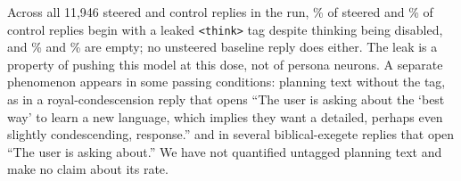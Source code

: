 Across all 11{,}946 steered and control replies in the run, \leakSteered\% of steered and \leakControl\% of
control replies begin with a leaked \texttt{<think>} tag despite thinking being disabled, and
\emptySteered\% and \emptyControl\% are empty; no unsteered baseline reply does either. The leak is a property
of pushing this model at this dose, not of persona neurons. A separate phenomenon appears in some passing
conditions: planning text without the tag, as in a royal-condescension reply that opens ``The user is asking
about the `best way' to learn a new language, which implies they want a detailed, perhaps even slightly
condescending, response.'' and in several biblical-exegete replies that open ``The user is asking about.''
We have not quantified untagged planning text and make no claim about its rate.
